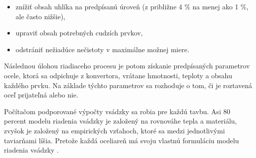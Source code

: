 \documentclass[]{tukediphc}
\begin{document}
\begin{itemize}
	\item znížiť obsah uhlíka na predpísanú úroveň (z približne 4 \% na menej ako 1 \%, ale často nižšie),
	\item upraviť obsah potrebných cudzích prvkov,
	\item odstrániť nežiadúce nečistoty v maximálne možnej miere.
\end{itemize}

Následnou úlohou riadiaceho procesu je potom získanie predpísaných parametrov ocele, ktorá sa odpichuje z konvertora, vrátane hmotnosti, teploty a obsahu každého prvku. Na základe týchto parametrov sa rozhoduje o tom, či je roztavená oceľ prijateľná alebo nie.

Počítačom podporované výpočty vsádzky sa robia pre každú tavbu. Asi 80 percent modelu riadenia vsádzky je založený na rovnováhe tepla a materiálu, zvyšok je založený na empirických vzťahoch, ktoré sa medzi jednotlivými taviarňami líšia. Pretože každá oceliareň má svoju vlastnú formuláciu modelu riadenia vsádzky \cite{Turkdogan1996}.



%

%
\end{document}
